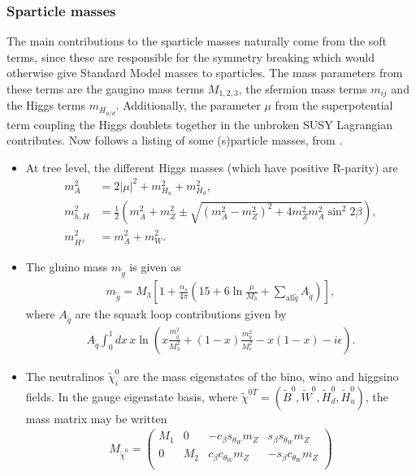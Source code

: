  \subsubsection{Sparticle masses}
 The main contributions to the sparticle masses naturally come from the soft terms, since these are responsible for the symmetry breaking which would otherwise give Standard Model masses to sparticles. The mass parameters from these terms are the gaugino mass terms $M_{1,2,3}$, the sfermion mass terms $m_{ij}$ and the Higgs terms $m_{H_{u/d}}$. Additionally, the parameter $\mu$ from the superpotential term coupling the Higgs doublets together in the unbroken SUSY Lagrangian contributes. Now follows a listing of some (s)particle masses, from \cite{Batzing:2013}.
 \begin{itemize}
 	\item At tree level, the different Higgs masses (which have positive R-parity) are
 	\begin{align}
 		m_A^2 &= 2|\mu|^2 + m^2_{H_u} + m^2_{H_d},\nonumber\\
 		m^2_{h,H} &= \frac{1}{2} \left( m_A^2 + m_Z^2 \pm \sqrt{(m_A^2 - m_Z^2)^2 + 4m_Z^2m_A^2\sin^2 2\beta} \right),\\
 		m^2_{H^\pm} &= m_A^2 + m_W^2.\nonumber
 	\end{align}
 	\item The gluino mass $m_{\tilde g}$ is given as
 	\begin{align}
 		m_{\tilde g} = M_3 \left[ 1 + \frac{\alpha_s}{4\pi}\left( 15 + 6\ln\frac{\mu}{M_3} + \sum_{\mathrm{all} \tilde q} A_{\tilde q} \right)\right],
 	\end{align}
 	where $A_{\tilde q}$ are the squark loop contributions given by
 	\begin{align}
 		A_{\tilde q} \int_0^1 dx \, x \ln\left( x \frac{m^2_{\tilde q}}{M_3^2} + (1-x)\frac{m_q^2}{M_e^2} - x(1-x) - i\epsilon \right).
 	\end{align}
 	\item The neutralinos $\tilde\chi_i^0$ are the mass eigenstates of the bino, wino and higgsino fields. In the gauge eigenstate basis, where $\tilde\chi^{0T} = (\tilde B^0, \tilde W^0, \tilde H_d^0, \tilde H_u^0)$, the mass matrix may be written
 	\begin{align}
 		M_{\tilde \chi^0} = \begin{pmatrix}
 			M_1 & 0 & - c_\beta s_{\theta_W} m_Z &  s_\beta s_{\theta_W} m_Z \\
 			0 & M_2 &  c_\beta c_{\theta_W} m_Z & - s_\beta c_{\theta_W} m_Z\\

\end{pmatrix}
\end{align}
\end{itemize}

